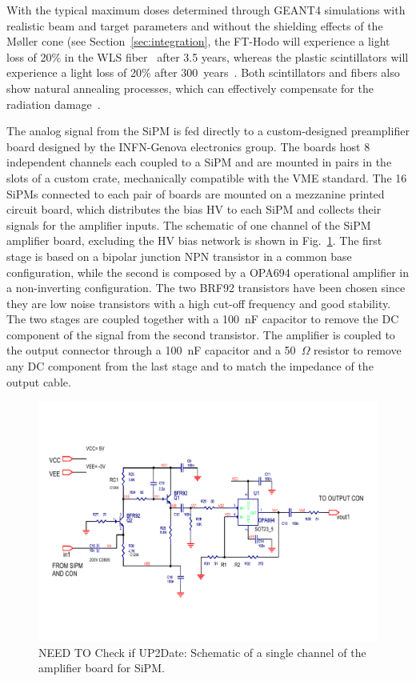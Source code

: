 With the typical maximum doses determined through GEANT4 simulations with realistic beam and target parameters
and without the shielding effects of the M{\o}ller cone (see Section~\ref{sec:integration}, the FT-Hodo will
experience a light loss of 20\% in the WLS fiber~\cite{ft-tdr} after 3.5 years, whereas the plastic scintillators will
experience a light loss of 20\% after 300~years~\cite{ft-tdr}. Both scintillators and fibers also show natural
annealing processes, which can effectively compensate for the radiation damage~\cite{ft-tdr}.  

The analog signal from the SiPM is fed directly to a custom-designed preamplifier board designed by the
INFN-Genova electronics group. The boards host 8 independent channels each coupled to a SiPM and are mounted
in pairs in the slots of a custom crate, mechanically compatible with the VME standard. The 16 SiPMs connected to
each pair of boards are mounted on a mezzanine printed circuit board, which distributes the bias HV to each SiPM
and collects their signals for the amplifier inputs. The schematic of one channel of the SiPM amplifier board,
excluding the HV bias network is shown in Fig.~\ref{Fig:FTHODOAmpBoard}. The first stage is based on a bipolar
junction NPN transistor in a common base configuration, while the second is composed by a OPA694 operational
amplifier in a non-inverting configuration. The two BRF92 transistors have been chosen since they are low noise
transistors with a high cut-off frequency and good stability. The two stages are coupled together with a 100~nF
capacitor to remove the DC component of the signal from the second transistor. The amplifier is coupled to the
output connector through a 100~nF capacitor and a 50~$\Omega$ resistor to remove any DC component from the
last stage and to match the impedance of the output cable. 

\begin{figure}[th!]
\centering 
\includegraphics[width=0.95\columnwidth]{./fig/FTHODOAmpBoard.pdf} 
\caption{NEED TO Check if UP2Date: Schematic of a single channel of the amplifier board for SiPM.} 
\label{Fig:FTHODOAmpBoard} 
\end{figure}

